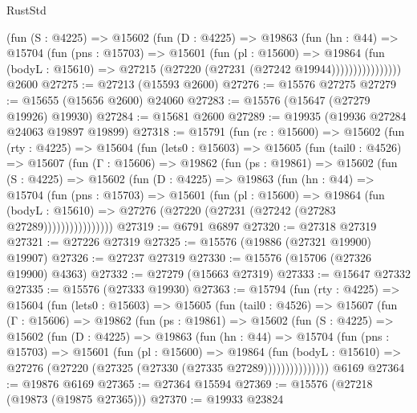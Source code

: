 \begin{lexlean}{RustStd}
\begin{coremodule}
                  (fun (S : @4225) =>
                  @15602
                    (fun (D : @4225) =>
                    @19863
                      (fun (hn : @44) =>
                      @15704
                        (fun (pns : @15703) =>
                        @15601
                          (fun (pl : @15600) =>
                          @19864
                            (fun (bodyL : @15610) =>
                            @27215 (@27220 (@27231 (@27242 @19944))))))))))))))))
    @2600
@27275 := @27213 (@15593 @2600)
@27276 := @15576 @27275
@27279 := @15655 (@15656 @2600) @24060
@27283 := @15576 (@15647 (@27279 @19926) @19930)
@27284 := @15681 @2600
@27289 := @19935 (@19936 @27284 @24063 @19897 @19899)
@27318 := @15791
    (fun (rc : @15600) =>
    @15602
      (fun (rty : @4225) =>
      @15604
        (fun (lets0 : @15603) =>
        @15605
          (fun (tail0 : @4526) =>
          @15607
            (fun (Γ : @15606) =>
            @19862
              (fun (ps : @19861) =>
              @15602
                (fun (S : @4225) =>
                @15602
                  (fun (D : @4225) =>
                  @19863
                    (fun (hn : @44) =>
                    @15704
                      (fun (pns : @15703) =>
                      @15601
                        (fun (pl : @15600) =>
                        @19864
                          (fun (bodyL : @15610) =>
                          @27276 (@27220 (@27231 (@27242 (@27283 @27289))))))))))))))))
@27319 := @6791 @6897
@27320 := @27318 @27319
@27321 := @27226 @27319
@27325 := @15576 (@19886 (@27321 @19900) @19907)
@27326 := @27237 @27319
@27330 := @15576 (@15706 (@27326 @19900) @4363)
@27332 := @27279 (@15663 @27319)
@27333 := @15647 @27332
@27335 := @15576 (@27333 @19930)
@27363 := @15794
    (fun (rty : @4225) =>
    @15604
      (fun (lets0 : @15603) =>
      @15605
        (fun (tail0 : @4526) =>
        @15607
          (fun (Γ : @15606) =>
          @19862
            (fun (ps : @19861) =>
            @15602
              (fun (S : @4225) =>
              @15602
                (fun (D : @4225) =>
                @19863
                  (fun (hn : @44) =>
                  @15704
                    (fun (pns : @15703) =>
                    @15601
                      (fun (pl : @15600) =>
                      @19864
                        (fun (bodyL : @15610) =>
                        @27276 (@27220 (@27325 (@27330 (@27335 @27289)))))))))))))))
    @6169
@27364 := @19876 @6169
@27365 := @27364 @15594
@27369 := @15576 (@27218 (@19873 (@19875 @27365)))
@27370 := @19933 @23824

\end{coremodule}
\end{lexlean}

